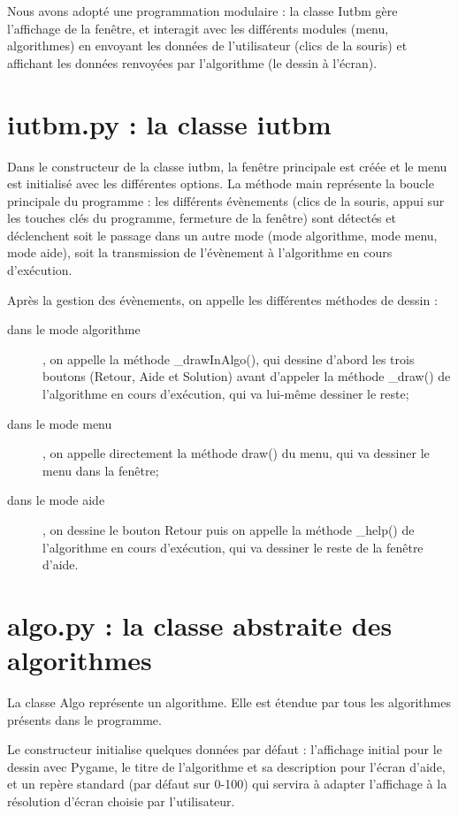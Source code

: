 \documentclass{scrreprt}
\begin{document}
Nous avons adopté une programmation modulaire : la classe Iutbm gère l'affichage de la
 fenêtre, et interagit avec les différents modules (menu, algorithmes) en envoyant les
 données de l'utilisateur (clics de la souris) et affichant les données renvoyées par
 l'algorithme (le dessin à l'écran).

\tableofcontents

\section{iutbm.py : la classe iutbm}

Dans le constructeur de la classe iutbm, la fenêtre principale est créée et le menu est
 initialisé avec les différentes options. La méthode main représente la boucle principale
 du programme : les différents évènements (clics de la souris, appui sur les touches clés
 du programme, fermeture de la fenêtre) sont détectés et déclenchent soit le passage
 dans un autre mode (mode algorithme, mode menu, mode aide), soit la transmission
 de l'évènement à l'algorithme en cours d'exécution.

Après la gestion des évènements, on appelle les différentes méthodes de dessin :

\begin{description}
	\item[dans le mode algorithme], on appelle la méthode \_drawInAlgo(), qui dessine
	 d'abord les trois boutons (Retour, Aide et Solution) avant d'appeler la méthode
	 \_draw() de l'algorithme en cours d'exécution, qui va lui-même dessiner le reste;
	\item[dans le mode menu], on appelle directement la méthode draw() du menu, qui
	 va dessiner le menu dans la fenêtre;
	\item[dans le mode aide], on dessine le bouton Retour puis on appelle la méthode
	 \_help() de l'algorithme en cours d'exécution, qui va dessiner le reste de la fenêtre
	 d'aide.
\end{description}

\section{algo.py : la classe abstraite des algorithmes}

La classe Algo représente un algorithme. Elle est étendue par tous les algorithmes
 présents dans le programme.

Le constructeur initialise quelques données par défaut : l'affichage initial pour le
 dessin avec Pygame, le titre de l'algorithme et sa description pour l'écran d'aide,
 et un repère standard (par défaut sur 0-100) qui servira à adapter l'affichage à la
 résolution d'écran choisie par l'utilisateur.
\end{document}
